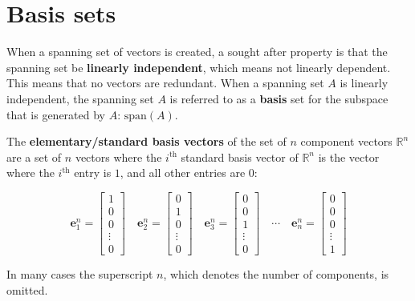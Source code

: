 \documentclass{article}
\begin{document}
\section*{Basis sets}

When a spanning set of vectors is created, a sought after property is that the spanning set be {\bf linearly independent}, which means not linearly dependent. This means that no vectors are redundant. When a spanning set \(A\) is linearly independent, the spanning set \(A\) is referred to as a {\bf basis} set for the subspace that is generated by \(A\): \(\text{span}(A)\).

\vspace{5mm}

The {\bf elementary/standard basis vectors} of the set of \(n\) component vectors \(\mathbb{R}^n\) are a set of \(n\) vectors where the \(i^\text{th}\) standard basis vector of \(\mathbb{R}^n\) is the vector where the \(i^\text{th}\) entry is \(1\), and all other entries are \(0\):

\[\mathbf{e}^n_{1} = \begin{bmatrix} 1 \\ 0 \\ 0 \\ \vdots \\ 0 \end{bmatrix} \quad \mathbf{e}^n_{2} = \begin{bmatrix} 0 \\ 1 \\ 0 \\ \vdots \\ 0 \end{bmatrix} \quad \mathbf{e}^n_{3} = \begin{bmatrix} 0 \\ 0 \\ 1 \\ \vdots \\ 0 \end{bmatrix} \quad \cdots \quad \mathbf{e}^n_{n} = \begin{bmatrix} 0 \\ 0 \\ 0 \\ \vdots \\ 1 \end{bmatrix}\]

In many cases the superscript \(n\), which denotes the number of components, is omitted.

\vspace{5mm}
\end{document}
